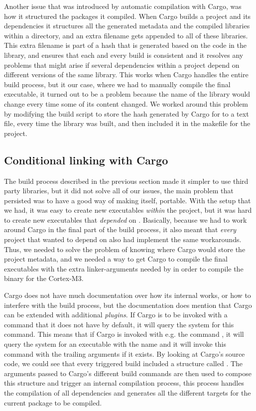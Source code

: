 Another issue that was introduced by automatic compilation with Cargo, was how it structured the packages it compiled.
When Cargo builds a project and its dependencies it structures all the generated metadata and the compiled libraries within a  directory, and an extra filename gets appended to all of these libraries.
This extra filename is part of a hash that is generated based on the code in the library, and ensures that each and every build is consistent and it resolves any problems that might arise if several dependencies within a project depend on different versions of the same library.
This works when Cargo handles the entire build process, but it our case, where we had to manually compile the final executable, it turned out to be a problem because the name of the library would change every time some of its content changed.
We worked around this problem by modifying the build script to store the hash generated by Cargo for {\emlib} to a text file, every time the library was built, and then included it in the makefile for the project.

\subsection{Conditional linking with Cargo}

The build process described in the previous section made it simpler to use third party libraries, but it did not solve all of our issues, the main problem that persisted was to have a good way of making {\emlib} itself, portable.
With the setup that we had, it was easy to create new executables \emph{within} the project, but it was hard to create new executables that \emph{depended} on {\emlib}.
Basically, because we had to work around Cargo in the final part of the build process, it also meant that \emph{every} project that wanted to depend on {\emlib} also had implement the same workarounds.
Thus, we needed to solve the problem of knowing where Cargo would store the project metadata, and we needed a way to get Cargo to compile the final executables with the extra linker-arguments needed by {\rustc} in order to compile the binary for the Cortex-M3.

Cargo does not have much documentation over how its internal works, or how to interfere with the build process, but the documentation does mention that Cargo can be extended with additional \emph{plugins}.
If Cargo is to be invoked with a command that it does not have by default, it will query the system for this command.
This means that if Cargo is invoked with e.g. the command , it will query the system for an executable with the name  and it will invoke this command with the trailing arguments if it exists.
By looking at Cargo's source code, we could see that every triggered build included a structure called .
The arguments passed to Cargo's different build commands are then used to compose this structure and trigger an internal compilation process, this process handles the compilation of all dependencies and generates all the different targets for the current package to be compiled.

